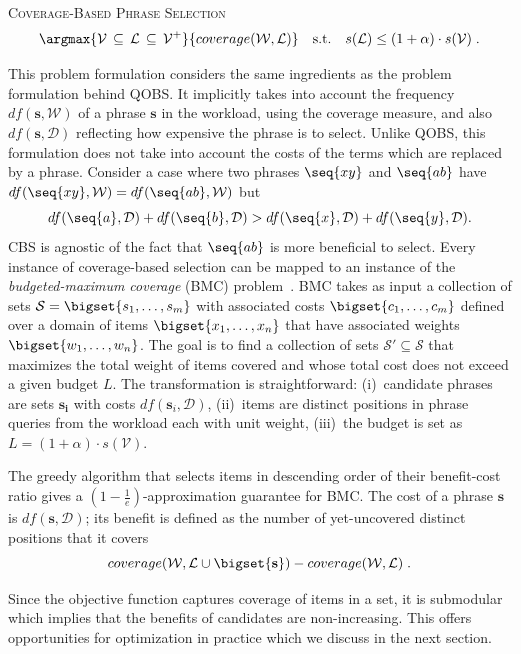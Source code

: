 \begin{definition}{\textsc{Coverage-Based Phrase Selection}}
$$
\argmax{\mathcal{V} \,\subseteq\, \mathcal{L} \,\subseteq\, \mathcal{V^+}}{coverage(\mathcal{W}, \mathcal{L})} \quad\mbox{s.t.}\quad s(\mathcal{L}) \le (1 + \alpha) \cdot s(\mathcal{V}) \;.
$$
\end{definition}

This problem formulation considers the same ingredients as the problem
formulation behind QOBS. It implicitly takes into account the
frequency $df(\mathbf{s}, \mathcal{W})$ of a phrase $\mathbf{s}$ in
the workload, using the coverage measure, and also
$df(\mathbf{s}, \mathcal{D})$ reflecting how expensive the phrase is
to select. Unlike QOBS, this formulation does not take into account
the costs of the terms which are replaced by a phrase. Consider a case
where two phrases $\seq{xy}$ and $\seq{ab}$ have
$df(\seq{xy}, \mathcal{W}) = df(\seq{ab}, \mathcal{W})$ but
$$df(\seq{a}, \mathcal{D}) + df(\seq{b}, \mathcal{D}) > df(\seq{x},
\mathcal{D}) + df(\seq{y}, \mathcal{D}).$$
CBS is agnostic of the fact that $\seq{ab}$ is more beneficial to
select. Every instance of coverage-based selection can be mapped to an
instance of the \emph{budgeted-maximum coverage} (BMC)
problem~\cite{budgetedmaxcover}. BMC takes as input a collection of sets
$\mathcal{S} = \bigset{s_1 ,\ldots, s_m}$ with associated costs
$\bigset{c_1, \ldots, c_m}$ defined over a domain of items
$\bigset{x_1, \ldots, x_n}$ that have associated weights
$\bigset{w_1, \ldots, w_n}$. The goal is to find a collection of sets
$\mathcal{S}' \subseteq \mathcal{S}$ that maximizes the total weight
of items covered and whose total cost does not exceed a given budget
$L$. The transformation is straightforward: (i)~candidate phrases are
sets $\mathbf{s_i}$ with costs ${df(\mathbf{s}_i, \mathcal{D})}$,
(ii)~items are distinct positions in phrase queries from the workload
each with unit weight, (iii)~the budget is set as
$L = (1 + \alpha) \cdot s(\mathcal{V})$.

The greedy algorithm that selects items in descending order of their
benefit-cost ratio gives a $(1 - \frac{1}{e})$-approximation guarantee
for BMC. The cost of a phrase $\mathbf{s}$ is
$df(\mathbf{s}, \mathcal{D})$; its benefit is defined as the number of
yet-uncovered distinct positions that it covers
$$
coverage(\mathcal{W}, \mathcal{L} \cup \bigset{\mathbf{s}}) - coverage(\mathcal{W}, \mathcal{L})\;.
$$

Since the objective function captures coverage of items in a set, it
is submodular which implies that the benefits of candidates are
non-increasing. This offers opportunities for optimization in
practice which we discuss in the next section.


